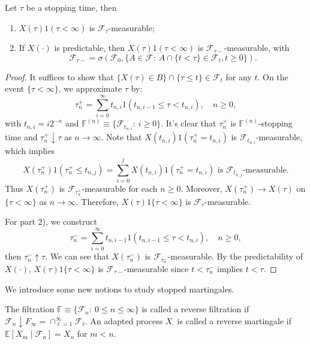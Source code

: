 \begin{proposition}
Let $\tau$ be a stopping time, then
\begin{enumerate}
\item
$X(\tau)1(\tau<\infty)$ is $\mathcal{F}_{\tau}$-measurable;
\item
If $X(\cdot)$ is predictable, then $X(\tau)1(\tau<\infty)$ is $\mathcal{F}_{\tau-}$-measurable,
with
\[
\mathcal{F}_{\tau-}=\sigma(\mathcal{F}_0, \{A\in\mathcal{F}:~
A\cap\{t<\tau\}\in\mathcal{F}_t, t\ge0\}).
\]
\end{enumerate}
\end{proposition}
\begin{proof}
It suffices to show that $\{X(\tau)\in B\}\cap\{\tau\le t\}\in\mathcal{F}_t$ for any $t$.
On the event $\{\tau<\infty\}$, we approximate $\tau$ by:
\[
\tau_n^+=\sum_{i=0}^\infty t_{n,i}1(t_{n,i-1}\le \tau<t_{n,i}),\quad n\ge0,
\]
with $t_{n,i}=i2^{-n}$ and $\mathbb{F}^{(n)}\equiv \{\mathcal{F}_{t_{n,i}}:~i\ge0\}$.
It's clear that $\tau_n^+$ is $\mathbb{F}^{(n)}$-stopping time and $\tau_n^+\downarrow \tau$ as $n\to\infty$.
Note that $X(t_{n,i})1(\tau_n^+=t_{n,i})$ is $\mathcal{F}_{t_{n,i}}$-measurable, which implies
\[
X(\tau_n^+)1(\tau_n^+\le t_{n,j})=\sum_{i=0}^{j}X(t_{n,i})1(\tau_n^+=t_{n,i})\text{ is $\mathcal{F}_{t_{n,j}}$-measurable}.
\]
Thus $X(\tau_n^+)$ is $\mathcal{F}_{\tau_n^+}$-measurable for each $n\ge0$.
Moreover, $X(\tau_n^+)\to X(\tau)$ on $\{\tau<\infty\}$ as $n\to\infty$. Therefore, $X(\tau)1\{\tau<\infty\}$ is $\mathcal{F}_{\tau}$-measurable.

For part 2), we construct
\[
\tau_n^-=\sum_{i=0}^\infty t_{n,i-1}1(t_{n,i-1}\le \tau<t_{n,i}),\quad n\ge0,
\]
then $\tau_n^-\uparrow \tau$. We can see that $X(\tau_n^-)$ is $\mathcal{F}_{\tau_n^-}$-measurable.
By the predictability of $X(\cdot)$, $X(\tau)1\{\tau<\infty\}$ is $\mathcal{F}_{\tau-}$-measurable since $t<\tau_n^-$ implies $t<\tau$.
\end{proof}

We introduce some new notions to study stopped martingales.
\begin{definition}
The filtration $\mathbb{F}\equiv\{\mathcal{F}_n:~0\le n\le\infty\}$ is called a reverse filtration if
$\mathcal{F}_n\downarrow F_\infty=\cap_{\ell=1}^\infty\mathcal{F}_{\ell}$.
An adapted process $X_{\cdot}$ is called a reverse martingale if $\mathbb{E}[X_m\mid\mathcal{F}_n]=X_n$ for $m<n$.
\end{definition}

